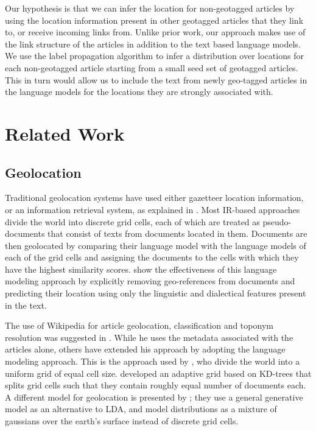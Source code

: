 \documentclass[11pt]{article}
\begin{document}
Our hypothesis is that we can infer the location for non-geotagged articles by using the location information present in other geotagged articles that they link to, or receive incoming links from.
Unlike prior work, our approach makes use of the link structure of the articles in addition to the text based language models.
We use the label propagation algorithm to infer a distribution over locations for each non-geotagged article starting from a small seed set of geotagged articles.
This in turn would allow us to include the text from newly geo-tagged articles in the language models for the locations they are strongly associated with.

\section{Related Work}
\subsection{Geolocation}
Traditional geolocation systems have used either gazetteer location information, or an information retrieval system, as explained in \cite{skiles:12}.
Most IR-based approaches divide the world into discrete grid cells, each of which are treated as pseudo-documents that consist of texts from documents located in them.
Documents are then geolocated by comparing their language model with the language models of each of the grid cells and assigning the documents to the cells with which they have the highest similarity scores.
\cite{eisenstein-smith-xing:11} show the effectiveness of this language modeling approach by explicitly removing geo-references from documents and predicting their location using only the linguistic and dialectical features present in the text.

The use of Wikipedia for article geolocation, classification and toponym resolution was suggested in \cite{overell2009geographic}.
While he uses the metadata associated with the articles alone, others have extended his approach by adopting the language modeling approach. 
This is the approach used by \cite{wing-baldridge:11}, who divide the world into a uniform grid of equal cell size.
\cite{rolleretal:12} developed an adaptive grid based on KD-trees that splits grid cells such that they contain roughly equal number of documents each.
A different model for geolocation is presented by \cite{eisensteinetal:11}; they use a general generative model as an alternative to LDA, and model distributions as a mixture of gaussians over the earth's surface instead of discrete grid cells. 
\end{document}
